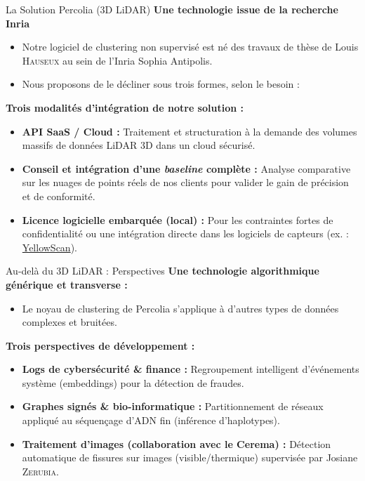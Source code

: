 \documentclass[A4,svgnames,9pt,aspectratio=169]{beamer}
\begin{document}
\begin{frame}{La Solution Percolia (3D LiDAR)}
    \textbf{\bleu Une technologie issue de la recherche Inria}
    \begin{itemize}
        \item Notre logiciel de clustering non supervisé est né des travaux de thèse de Louis \textsc{Hauseux} au sein de l'Inria Sophia Antipolis.
        \item Nous proposons de le décliner sous trois formes, selon le besoin :
    \end{itemize}

    \vspace{0.2cm}
    
    \textbf{\bleu Trois modalités d'intégration de notre solution :}
    \begin{itemize}
        \item \textbf{API SaaS / Cloud :} Traitement et structuration à la demande des volumes massifs de données LiDAR 3D dans un cloud sécurisé.
        \item \textbf{Conseil et intégration d'une \emph{baseline} complète :} Analyse comparative sur les nuages de points réels de nos clients pour valider le gain de précision et de conformité.
        \item \textbf{Licence logicielle embarquée (local) :} Pour les contraintes fortes de confidentialité ou une intégration directe dans les logiciels de capteurs (ex. : \href{https://www.yellowscan.com/}{YellowScan}).
    \end{itemize}
\end{frame}

\begin{frame}{Au-delà du 3D LiDAR : Perspectives}
    \textbf{\bleu Une technologie algorithmique générique et transverse :}
    \begin{itemize}
        \item Le noyau de clustering de Percolia s'applique à d'autres types de données complexes et bruitées.
    \end{itemize}

    \vspace{0.2cm}

    \textbf{\bleu Trois perspectives de développement :}
    \begin{itemize}
        \item \textbf{Logs de cybersécurité \& finance :} Regroupement intelligent d'événements système (embeddings) pour la détection de fraudes.
        \item \textbf{Graphes signés \& bio-informatique :} Partitionnement de réseaux appliqué au séquençage d'ADN fin (inférence d'haplotypes).
        \item \textbf{Traitement d'images (collaboration avec le Cerema) :} Détection automatique de fissures sur images (visible/thermique) supervisée par Josiane \textsc{Zerubia}.
    \end{itemize}
\end{frame}
\end{document}
